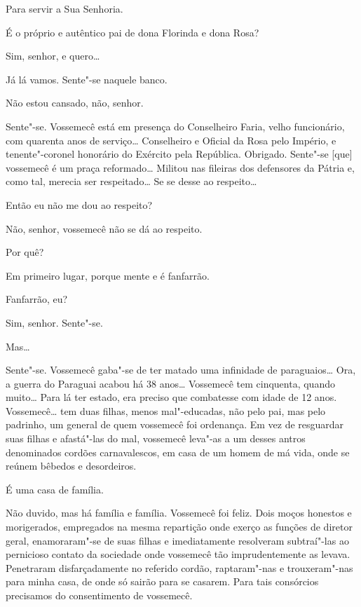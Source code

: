 \begin{linenumbers}
 Para servir a Sua Senhoria.

 É o próprio e autêntico pai de dona Florinda e dona
Rosa?

 Sim, senhor, e quero\ldots{}

 Já lá vamos. Sente"-se naquele banco.

 Não estou cansado, não, senhor.

 Sente"-se.   Vossemecê está em
presença do Conselheiro Faria, velho funcionário, com quarenta anos de
serviço\ldots{} Conselheiro e Oficial da Rosa pelo Império, e tenente"-coronel
honorário do Exército pela República.   Obrigado. Sente"-se [que] vossemecê é um praça
reformado\ldots{} Militou nas fileiras dos defensores da Pátria e, como tal, merecia
ser respeitado\ldots{} Se se desse ao respeito\ldots{}

 Então eu não me dou ao respeito?

 Não, senhor, vossemecê não se dá ao respeito.

 Por quê?

 Em primeiro lugar, porque mente e é fanfarrão.

  Fanfarrão, eu?

 Sim, senhor. Sente"-se.

 Mas\ldots{}

 Sente"-se.   Vossemecê gaba"-se de
ter matado uma infinidade de paraguaios\ldots{} Ora, a guerra do Paraguai acabou há
38 anos\ldots{} Vossemecê tem cinquenta, quando muito\ldots{} Para lá ter
estado, era preciso que combatesse com idade de 12 anos.   Vossemecê\ldots{} tem duas filhas, menos mal"-educadas, não pelo
pai, mas pelo padrinho, um general de quem vossemecê foi ordenança. Em vez de
resguardar suas filhas e afastá"-las do mal, vossemecê leva"-as a um desses antros
denominados cordões carnavalescos, em casa de um homem de má vida, onde se
reúnem bêbedos e desordeiros.

 É uma casa de família.

 Não duvido, mas há família e família.   Vossemecê foi feliz. Dois moços honestos e morigerados,
empregados na mesma repartição onde exerço as funções de diretor geral,
enamoraram"-se de suas filhas e imediatamente resolveram subtraí"-las ao
pernicioso contato da sociedade onde vossemecê tão imprudentemente as levava.
Penetraram disfarçadamente no referido cordão, raptaram"-nas e trouxeram"-nas para
minha casa, de onde só sairão para se casarem. Para tais consórcios precisamos
do consentimento de vossemecê.


\end{linenumbers}
